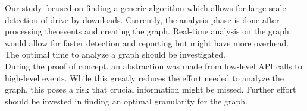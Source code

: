 Our study focused on finding a generic algorithm which allows for large-scale detection of drive-by downloads. Currently, the analysis phase is done after processing the events and creating the graph. Real-time analysis on the graph would allow for faster detection and reporting but might have more overhead. The optimal time to analyze a graph should be investigated.\\

During the proof of concept, an abstraction was made from low-level API calls to high-level events. While this greatly reduces the effort needed to analyze the graph, this poses a risk that crucial information might be missed. Further effort should be invested in finding an optimal granularity for the graph.

